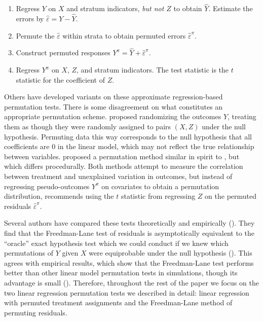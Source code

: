 \documentclass[12pt]{article}
\begin{document}
\begin{enumerate}
\item Regress $Y$ on $X$ and stratum indicators, \textit{but not $Z$} to obtain $\hat{Y}$. Estimate the errors by $\hat{\varepsilon} = Y - \hat{Y}$.
\item Permute the $\hat{\varepsilon}$ within strata to obtain permuted errors $\hat{\varepsilon}^\pi$.
\item Construct permuted responses $Y^\pi = \hat{Y}+ \hat{\varepsilon}^\pi$.
\item Regress $Y^\pi$ on $X$, $Z$, and stratum indicators. The test statistic is the $t$ statistic for the coefficient of $Z$.
\end{enumerate}


Others have developed variants on these approximate regression-based permutation tests. 
There is some disagreement on what constitutes an appropriate permutation scheme.
\cite{manly_randomization_2006} proposed randomizing the outcomes $Y$, treating them as though they were randomly assigned to pairs $(X, Z)$ under the null hypothesis.
Permuting data this way corresponds to the null hypothesis that all coefficients are 0 in the linear model, which may not reflect the true relationship between variables.
\cite{kennedy_randomization_1995} proposed a permutation method similar in spirit to \cite{freedman_nonstochastic_1983}, but which differs procedurally.
Both methods attempt to measure the correlation between treatment and unexplained variation in outcomes, but
instead of regressing pseudo-outcomes $Y^\pi$ on covariates to obtain a permutation distribution, \cite{kennedy_randomization_1995} recommends using the $t$ statistic from regressing $Z$ on the permuted residuals $\hat{\varepsilon}^\pi$. 

Several authors have compared these tests theoretically and empirically (\cite{anderson_empirical_1999, anderson_permutation_2001, kennedy_randomization_1996}).
They find that the Freedman-Lane test of residuals is asymptotically equivalent to the ``oracle'' exact hypothesis test which we could conduct if we knew which permutations of $Y$ given $X$ were equiprobable under the null hypothesis (\cite{anderson_permutation_2001}).
This agrees with empirical results, which show that the Freedman-Lane test performs better than other linear model permutation tests in simulations, though its advantage is small (\cite{anderson_empirical_1999}). 
Therefore, throughout the rest of the paper we focus on the two linear regression permutation tests we described in detail: linear regression with permuted treatment assignments and the Freedman-Lane method of permuting residuals.
\end{document}
